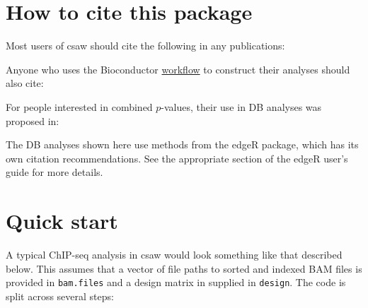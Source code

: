 \documentclass[12pt]{report}
\newcommand{\edger}{edgeR}
\newcommand{\pkgname}{csaw}
\newcommand{\code}[1]{{\small\texttt{#1}}}
\begin{document}
\renewcommand{\natexlab}[1]{}

\section{How to cite this package}
Most users of \pkgname{} should cite the following in any publications:
\begin{quote}
\end{quote}
Anyone who uses the Bioconductor \href{https://www.bioconductor.org/help/workflows/chipseqDB/}{workflow} to construct their analyses should also cite:
\begin{quote}
\end{quote}
For people interested in combined $p$-values, their use in DB analyses was proposed in:
\begin{quote}
\end{quote}
The DB analyses shown here use methods from the \edger{} package, which has its own citation recommendations.
See the appropriate section of the edgeR user's guide for more details.

\renewcommand{\natexlab}[1]{#1}

\section{Quick start}
A typical ChIP-seq analysis in \pkgname{} would look something like that described below. 
This assumes that a vector of file paths to sorted and indexed BAM files is provided in \code{bam.files} and a design matrix in supplied in \code{design}.
The code is split across several steps:
\end{document}
